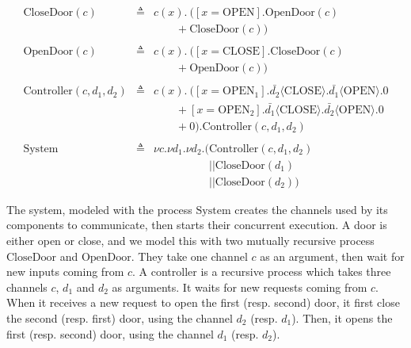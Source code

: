 \begin{example}
  \[
    \begin{array}{rcl}
      \mathrm{CloseDoor}(c)
      & \triangleq
      & c(x) . \ ([x = \mathrm{OPEN}] . \mathrm{OpenDoor}(c) \\
      &
      & \qquad + \mathrm{CloseDoor}(c)) \\
      & & \\
      \mathrm{OpenDoor}(c)
      & \triangleq
      & c(x) . \ ([x = \mathrm{CLOSE}] . \mathrm{CloseDoor}(c) \\
      &
      & \qquad + \mathrm{OpenDoor}(c)) \\
      & & \\
      \mathrm{Controller}(c, d_1, d_2)
      & \triangleq
      & c(x). \ ([x = \mathrm{OPEN}_1] . \bar{d_2} \langle
        \mathrm{CLOSE} \rangle . \bar{d_1} \langle \mathrm{OPEN} \rangle . 0 \\
      &
      & \qquad + [x = \mathrm{OPEN}_2] . \bar{d_1} \langle
        \mathrm{CLOSE} \rangle . \bar{d_2} \langle \mathrm{OPEN} \rangle.0 \\
      &
      & \qquad + 0) . \mathrm{Controller}(c, d_1, d_2) \\
      & & \\
      \mathrm{System}
      & \triangleq
      & \nu c. \nu d_1. \nu d_2. (\mathrm{Controller}(c, d_1, d_2) \\
      &
      & \quad\qquad\qquad || \mathrm{CloseDoor}(d_1) \\
      &
      & \quad\qquad\qquad || \mathrm{CloseDoor}(d_2))
    \end{array}
  \]

  The system, modeled with the process \( \mathrm{System} \) creates the
  channels used by its components to communicate, then starts their concurrent
  execution.
  A door is either open or close, and we model this with two mutually recursive
  process \( \mathrm{CloseDoor} \) and \( \mathrm{OpenDoor} \).
  They take one channel \( c \) as an argument, then wait for new inputs coming
  from \( c \).
  A controller is a recursive process which takes three channels \( c \),
  \( d_1 \) and \( d_2 \) as arguments.
  It waits for new requests coming from \( c \).
  When it receives a new request to open the first (resp. second) door, it first
  close the second (resp. first) door, using the channel \( d_2 \) (resp. \( d_1
  \)).
  Then, it opens the first (resp. second) door, using the channel \( d_1 \)
  (resp. \( d_2 \)).
\end{example}

